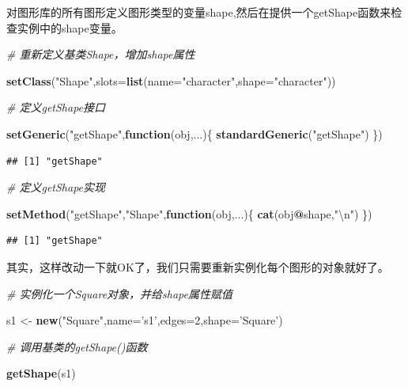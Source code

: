 \documentclass[]{book}
\newenvironment{Shaded}{\begin{snugshade}}{\end{snugshade}}
\newcommand{\KeywordTok}[1]{\textcolor[rgb]{0.13,0.29,0.53}{\textbf{#1}}}
\newcommand{\DataTypeTok}[1]{\textcolor[rgb]{0.13,0.29,0.53}{#1}}
\newcommand{\DecValTok}[1]{\textcolor[rgb]{0.00,0.00,0.81}{#1}}
\newcommand{\CharTok}[1]{\textcolor[rgb]{0.31,0.60,0.02}{#1}}
\newcommand{\StringTok}[1]{\textcolor[rgb]{0.31,0.60,0.02}{#1}}
\newcommand{\CommentTok}[1]{\textcolor[rgb]{0.56,0.35,0.01}{\textit{#1}}}
\newcommand{\ControlFlowTok}[1]{\textcolor[rgb]{0.13,0.29,0.53}{\textbf{#1}}}
\newcommand{\OperatorTok}[1]{\textcolor[rgb]{0.81,0.36,0.00}{\textbf{#1}}}
\newcommand{\NormalTok}[1]{#1}
\begin{document}
对图形库的所有图形定义图形类型的变量shape,然后在提供一个getShape函数来检查实例中的shape变量。

\begin{Shaded}
\begin{Highlighting}[]
\CommentTok{# 重新定义基类Shape，增加shape属性}

\KeywordTok{setClass}\NormalTok{(}\StringTok{"Shape"}\NormalTok{,}\DataTypeTok{slots=}\KeywordTok{list}\NormalTok{(}\DataTypeTok{name=}\StringTok{"character"}\NormalTok{,}\DataTypeTok{shape=}\StringTok{"character"}\NormalTok{))}

\CommentTok{# 定义getShape接口}

\KeywordTok{setGeneric}\NormalTok{(}\StringTok{"getShape"}\NormalTok{,}\ControlFlowTok{function}\NormalTok{(obj,...)\{}
  \KeywordTok{standardGeneric}\NormalTok{(}\StringTok{"getShape"}\NormalTok{)}
\NormalTok{\})}
\end{Highlighting}
\end{Shaded}

\begin{verbatim}
## [1] "getShape"
\end{verbatim}

\begin{Shaded}
\begin{Highlighting}[]
\CommentTok{# 定义getShape实现}

\KeywordTok{setMethod}\NormalTok{(}\StringTok{"getShape"}\NormalTok{,}\StringTok{"Shape"}\NormalTok{,}\ControlFlowTok{function}\NormalTok{(obj,...)\{}
  \KeywordTok{cat}\NormalTok{(obj}\OperatorTok{@}\NormalTok{shape,}\StringTok{"}\CharTok{\textbackslash{}n}\StringTok{"}\NormalTok{)}
\NormalTok{\})}
\end{Highlighting}
\end{Shaded}

\begin{verbatim}
## [1] "getShape"
\end{verbatim}

其实，这样改动一下就OK了，我们只需要重新实例化每个图形的对象就好了。

\begin{Shaded}
\begin{Highlighting}[]
\CommentTok{# 实例化一个Square对象，并给shape属性赋值}

\NormalTok{s1 <-}\StringTok{ }\KeywordTok{new}\NormalTok{(}\StringTok{"Square"}\NormalTok{,}\DataTypeTok{name=}\StringTok{'s1'}\NormalTok{,}\DataTypeTok{edges=}\DecValTok{2}\NormalTok{,}\DataTypeTok{shape=}\StringTok{'Square'}\NormalTok{)}

\CommentTok{# 调用基类的getShape()函数}

\KeywordTok{getShape}\NormalTok{(s1)}
\end{Highlighting}
\end{Shaded}
\end{document}
